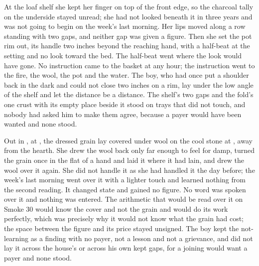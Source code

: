 At the loaf shelf she kept her finger on top of the front edge, so the charcoal tally on the underside stayed unread; she had not looked beneath it in three years and was not going to begin on the week's last morning. Her lips moved along a row standing with two gaps, and neither gap was given a figure. Then she set the pot rim out, its handle two inches beyond the reaching hand, with a half-beat at the setting and no look toward the bed. The half-beat went where the look would have gone. No instruction came to the basket at any hour; the instruction went to the fire, the wool, the pot and the water. The boy, who had once put a shoulder back in the dark and could not close two inches on a rim, lay under the low angle of the shelf and let the distance be a distance. The shelf's two gaps and the fold's one crust with its empty place beside it stood on trays that did not touch, and nobody had asked him to make them agree, because a payer would have been wanted and none stood.

Out in , at , the dressed grain lay covered under wool on the cool stone at , away from the hearth. She drew the wool back only far enough to feel for damp, turned the grain once in the flat of a hand and laid it where it had lain, and drew the wool over it again. She did not handle it as she had handled it the day before; the week's last morning went over it with a lighter touch and learned nothing from the second reading. It changed state and gained no figure. No word was spoken over it and nothing was entered. The arithmetic that would be read over it on Smoke 30 would know the cover and not the grain and would do its work perfectly, which was precisely why it would not know what the grain had cost; the space between the figure and its price stayed unsigned. The boy kept the not-learning as a finding with no payer, not a lesson and not a grievance, and did not lay it across the house's  or across his own kept gaps, for a joining would want a payer and none stood.

\scenebreak


